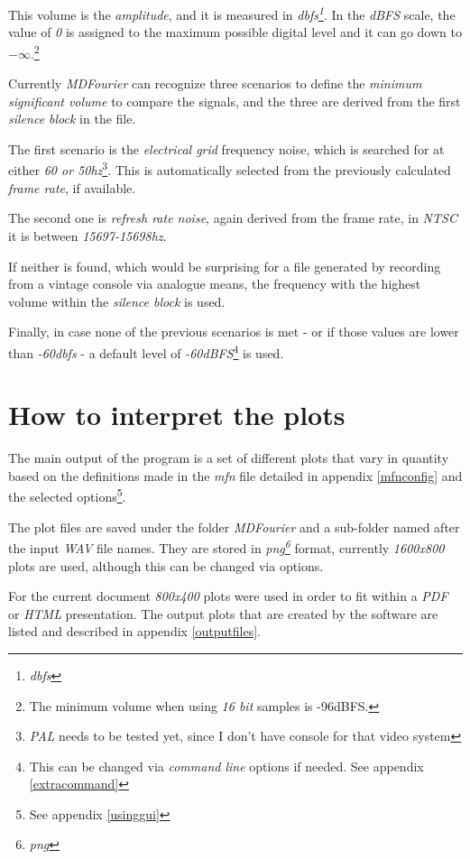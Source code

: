 \documentclass[10pt,a4paper]{report}
\newcommand{\define}[1]{
	\textit{\acrshort{#1}\footnote{\textit{\acrlong{#1}}}}}
\begin{document}
This volume is the \textit{amplitude}, and it is measured in \define{dbfs}. In the \textit{dBFS} scale, the value of \textit{0} is assigned to the maximum possible digital level and it can go down to $-\infty$.\footnote{The minimum volume when using \textit{16 bit} samples is -96dBFS.}

Currently \textit{MDFourier} can recognize three scenarios to define the \textit{minimum significant volume} to compare the signals, and the three are derived from the first \textit{silence block} in the file.

The first scenario is the \textit{electrical grid} frequency noise, which is searched for at either \textit{60 or 50hz}\footnote{\textit{PAL} needs to be tested yet, since I don't have console for that video system}. This is automatically selected from the previously calculated \textit{frame rate}, if available.

The second one is \textit{refresh rate noise}, again derived from the frame rate, in \textit{NTSC} it is between \textit{15697-15698hz}. 

If neither is found, which would be surprising for a file generated by recording from a vintage console via analogue means, the frequency with the highest volume within the \textit{silence block} is used. 

Finally, in case none of the previous scenarios is met - or if those values are lower than \textit{-60}\textit{dbfs} - a default level of \textit{-60dBFS}\footnote{This can be changed via \textit{command line} options if needed. See appendix \ref{extracommand}} is used. 

\chapter{How to interpret the plots}
\label{howtoplots}

The main output of the program is a set of different plots that vary in quantity based on the definitions made in the \textit{mfn} file detailed in appendix \ref{mfnconfig} and the selected options\footnote{See appendix \ref{usinggui}}.

The plot files are saved under the folder \textit{MDFourier} and a sub-folder named after the input \textit{WAV} file names. They are stored in \define{png} format, currently \textit{1600x800} plots are used, although this can be changed via options. 

For the current document \textit{800x400} plots were used in order to fit within a \textit{PDF} or \textit{HTML} presentation. The output plots that are created by the software are listed and described in appendix \ref{outputfiles}.
\end{document}
